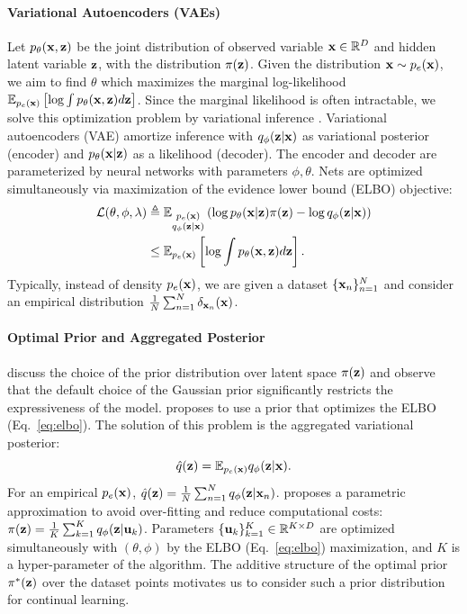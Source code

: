 \paragraph{Variational Autoencoders (VAEs)} Let $p_{\theta}({\mathbf{x}}, {\mathbf{z}})$ be the joint distribution of observed variable ${\mathbf{x}}\in\mathbb{R}^{D}$ and hidden latent variable ${\mathbf{z}}$, with the distribution $\pi({\mathbf{z}})$. Given the distribution ${\mathbf{x}}\sim p_{e}({\mathbf{x}})$, we aim to find $\theta$ which maximizes the marginal log-likelihood $ \mathbb{E}_{p_{e}({\mathbf{x}})}\left [\log \int p_{\theta}({\mathbf{x}}, {\mathbf{z}})d{\mathbf{z}}\right]$. Since the marginal likelihood is often intractable, we solve this optimization problem by variational inference \citep{jordan1999introduction}. Variational autoencoders (VAE) \citep{kingma2014autoencoding, rezende2014stochastic} amortize inference with $q_{\phi}({\mathbf{z}}|{\mathbf{x}})$ as variational posterior (encoder) and $p_{\theta}({\mathbf{x}}|{\mathbf{z}})$ as a likelihood (decoder). The encoder and decoder are parameterized by neural networks with parameters $\phi, \theta$. Nets are optimized simultaneously via maximization of the evidence lower bound (ELBO) objective:
\begin{equation}
\label{eq:elbo}
\begin{aligned}
    \mathcal{L}(\theta, \phi, \lambda) & \triangleq  \E_{\substack{p_{e}(\rvx)\\q_{\phi}(\rvz|\rvx)}}\left(\log p_{\theta}(\rvx|\rvz)\pi(\rvz) - \log q_{\phi}(\rvz|\rvx)\right)   \\
    & \leq  \E_{p_{e}(\rvx)}\left [\log \int p_{\theta}(\rvx, \rvz)d\rvz\right].
\end{aligned}
\end{equation}
Typically, instead of density $p_{e}({\mathbf{x}})$, we are given a dataset $\{{\mathbf{x}}_n\}_{n=1}^{N}$ and consider an empirical distribution $\tfrac{1}{N}\sum_{n=1}^{N}\delta_{{\mathbf{x}}_n}({\mathbf{x}})$.
\paragraph{Optimal Prior and Aggregated Posterior} \citet{hoffman2016elbo, goyal2017nonparametric} discuss the choice of the prior distribution over latent space $\pi({\mathbf{z}})$ and observe that the default choice of the Gaussian prior significantly restricts the expressiveness of the model. \citet{tomczak2018vae} proposes to use a prior that optimizes the ELBO (Eq.~\ref{eq:elbo}). The solution of this problem is the aggregated variational posterior:
\begin{equation}
\hat{q}({\mathbf{z}})=\mathbb{E}_{p_{e}({\mathbf{x}})}q_{\phi}({\mathbf{z}}|{\mathbf{x}}).
\end{equation}
For an empirical $p_e({\mathbf{x}})$, $\hat{q}({\mathbf{z}})=\tfrac{1}{N}\sum_{n=1}^{N}q_{\phi}({\mathbf{z}}|{\mathbf{x}}_n)$. \citet{tomczak2018vae} proposes a parametric approximation to avoid over-fitting and reduce computational costs: $\pi({\mathbf{z}}) = \frac{1}{K}\sum_{k=1}^{K}q_{\phi}({\mathbf{z}}|{\mathbf{u}}_k)$. 
Parameters $\{{\mathbf{u}}_k\}_{k=1}^{K}\in\mathbb{R}^{K\times D}$ are optimized simultaneously with $(\theta, \phi)$ by the ELBO (Eq.~\ref{eq:elbo}) maximization, and $K$ is a hyper-parameter of the algorithm. 
The additive structure of the optimal prior $\pi^{*}({\mathbf{z}})$ over the dataset points motivates us to consider such a prior distribution for continual learning.
